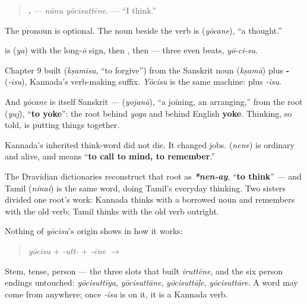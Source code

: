 \begin{quote}
\textbf{ .} — \emph{nānu yōcisuttēne.} — \textquotedblleft{}I think.\textquotedblright{}
\end{quote}

The pronoun is optional. The noun beside the verb is \textbf{} (\emph{yōcane}), \textquotedblleft{}a thought.\textquotedblright{}

\begin{sounds}
\textbf{} is \textbf{} (\emph{ya}) with the long-\emph{ō} sign, then \textbf{}, then \textbf{} — three even beats, \emph{yō-ci-su}.
\end{sounds}

\begin{cousinweb}
Chapter 9 built \textbf{} (\emph{kṣamisu}, \textquotedblleft{}to forgive\textquotedblright{}) from the Sanskrit noun \textbf{} (\emph{kṣamā}) plus \textbf{‑} (\emph{‑isu}), Kannada's verb-making suffix. \emph{Yōcisu} is the same machine: \textbf{} plus \emph{‑isu}.

And \emph{yōcane} is itself Sanskrit — \textbf{} (\emph{yojanā}), \textquotedblleft{}a joining, an arranging,\textquotedblright{} from the root \textbf{} (\emph{yuj}), \textquotedblleft{}\textbf{to yoke}\textquotedblright{}: the root behind \emph{yoga} and behind English \textbf{yoke}. Thinking, so told, is putting things together.
\end{cousinweb}

\begin{cousinweb}
Kannada's inherited think-word did not die. It changed jobs. \textbf{} (\emph{nene}) is ordinary and alive, and means \textquotedblleft{}\textbf{to call to mind, to remember}.\textquotedblright{}

The Dravidian dictionaries reconstruct that root as \emph{\textbf{*nen-ay}}, \textquotedblleft{}\textbf{to think}\textquotedblright{} — and Tamil \textbf{} (\emph{ninai}) is the same word, doing Tamil's everyday thinking. Two sisters divided one root's work: Kannada thinks with a borrowed noun and remembers with the old verb; Tamil thinks with the old verb outright.
\end{cousinweb}

\begin{grammarlens}[title={Grammar Lens: a borrowed stem, the native machine}]
Nothing of \emph{yōcisu}'s origin shows in how it works:

\begin{quote}
\emph{yōcisu} + \emph{-utt-} + \emph{-ēne} $\to$ \textbf{}
\end{quote}

Stem, tense, person — the three slots that built \emph{iruttēne}, and the six person endings untouched: \emph{yōcisuttīya}, \emph{yōcisuttāne}, \emph{yōcisuttāḷe}, \emph{yōcisuttāre}. A word may come from anywhere; once \emph{‑isu} is on it, it is a Kannada verb.
\end{grammarlens}

